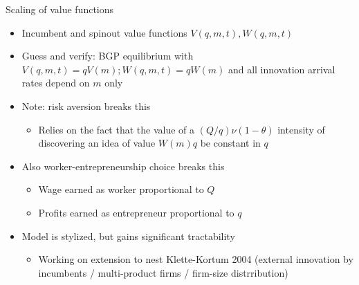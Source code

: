 \documentclass[english,usenames,dvipsnames]{beamer}
\begin{document}
\begin{frame}{Scaling of value functions}
\begin{itemize}
\item Incumbent and spinout value functions $V(q,m,t),W(q,m,t)$
\item Guess and verify: BGP equilibrium with $V(q,m,t) = qV(m); W(q,m,t) = qW(m)$ and all innovation arrival rates depend on $m$ only
\item Note: \alert{risk aversion} breaks this
\begin{itemize}
\item Relies on the fact that the value of a $(Q/q) \nu (1-\theta)$ intensity of discovering an idea of value $W(m)q$ be \alert{constant in $q$}
\end{itemize}
\item Also \alert{worker-entrepreneurship choice} breaks this
\begin{itemize}
\item Wage earned as worker proportional to $Q$
\item Profits earned as entrepreneur proportional to $q$
\end{itemize}
\item Model is stylized, but gains significant tractability
\begin{itemize}
\item Working on extension to nest Klette-Kortum 2004 (external innovation by incumbents / multi-product firms / firm-size distrribution)
\end{itemize}
\end{itemize}
\end{frame}
\end{document}
